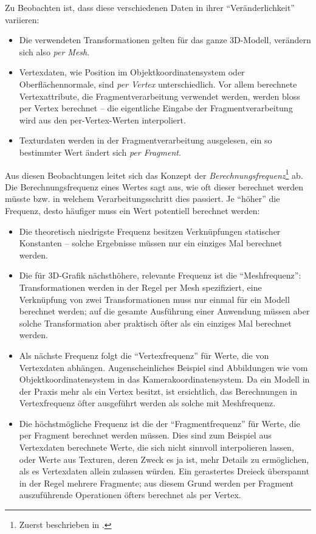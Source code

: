 \documentclass[twoside,a4paper,fleqn,12pt]{book}
\begin{document}
Zu Beobachten ist, dass diese verschiedenen Daten in ihrer "`Veränderlichkeit"' variieren:
\begin{itemize}
\item Die verwendeten Transformationen gelten für das ganze 3D-Modell, verändern sich also \emph{per Mesh}.
\item Vertexdaten, wie Position im Objektkoordinatensystem oder Oberflächennormale, sind \emph{per Vertex}
unterschiedlich. Vor allem berechnete Vertexattribute, die Fragmentverarbeitung verwendet werden, werden
bloss per Vertex berechnet -- die eigentliche Eingabe der Fragmentverarbeitung wird aus den per-Vertex-Werten
interpoliert.
\item Texturdaten werden in der Fragmentverarbeitung ausgelesen, ein so bestimmter Wert ändert sich \emph{per Fragment}.
\end{itemize}

Aus diesen Beobachtungen leitet sich das Konzept der \emph{Berechnungsfrequenz}\footnote{Zuerst beschrieben in \cite{stanford_rtsl}.} ab.
Die Berechnungsfrequenz eines Wertes sagt aus, wie oft dieser berechnet werden müsste bzw. in welchem Verarbeitungsschritt
dies passiert. Je "`höher"' die Frequenz, desto häufiger muss ein Wert potentiell berechnet werden:
\begin{itemize}
\item Die theoretisch niedrigste Frequenz besitzen Verknüpfungen statischer Konstanten -- solche Ergebnisse müssen nur ein einziges Mal berechnet werden.
\item Die für 3D-Grafik nächsthöhere, relevante Frequenz ist die "`Meshfrequenz"': Transformationen werden in der Regel per Mesh spezifiziert,
eine Verknüpfung von zwei Transformationen muss nur einmal für ein Modell berechnet werden; auf die gesamte Ausführung einer Anwendung
müssen aber solche Transformation aber praktisch öfter als ein einziges Mal berechnet werden.
\item Als nächste Frequenz folgt die "`Vertexfrequenz"' für Werte, die von Vertexdaten abhängen. Augenscheinliches Beispiel sind Abbildungen
wie vom Objektkoordinatensystem in das Kamerakoordinatensystem. Da ein Modell in der Praxis mehr als ein Vertex besitzt,
ist ersichtlich, das Berechnungen in Vertexfrequenz öfter ausgeführt werden als solche mit Meshfrequenz.
\item Die höchstmögliche Frequenz ist die der "`Fragmentfrequenz"' für Werte, die per Fragment berechnet werden müssen.
Dies sind zum Beispiel aus Vertexdaten berechnete Werte, die sich nicht sinnvoll interpolieren lassen, oder Werte aus Texturen,
deren Zweck es ja ist, mehr Details zu ermöglichen, als es Vertexdaten allein zulassen würden.
Ein gerastertes Dreieck überspannt in der Regel mehrere Fragmente; aus diesem Grund werden per Fragment auszuführende Operationen
öfters berechnet als per Vertex.
\end{itemize}
\end{document}
